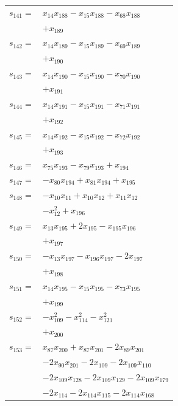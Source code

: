 \begin{longtable}{@{}r@{\;}l@{}}
\(s_{141}=\) & \(\displaystyle x_{14}x_{188} -x_{15}x_{188} -x_{68}x_{188}\) \\
 & \(\displaystyle +x_{189}\) \\[3pt]
\(s_{142}=\) & \(\displaystyle x_{14}x_{189} -x_{15}x_{189} -x_{69}x_{189}\) \\
 & \(\displaystyle +x_{190}\) \\[3pt]
\(s_{143}=\) & \(\displaystyle x_{14}x_{190} -x_{15}x_{190} -x_{70}x_{190}\) \\
 & \(\displaystyle +x_{191}\) \\[3pt]
\(s_{144}=\) & \(\displaystyle x_{14}x_{191} -x_{15}x_{191} -x_{71}x_{191}\) \\
 & \(\displaystyle +x_{192}\) \\[3pt]
\(s_{145}=\) & \(\displaystyle x_{14}x_{192} -x_{15}x_{192} -x_{72}x_{192}\) \\
 & \(\displaystyle +x_{193}\) \\[3pt]
\(s_{146}=\) & \(\displaystyle x_{75}x_{193} -x_{79}x_{193} +x_{194}\) \\[3pt]
\(s_{147}=\) & \(\displaystyle -x_{80}x_{194} +x_{81}x_{194} +x_{195}\) \\[3pt]
\(s_{148}=\) & \(\displaystyle -x_{10}x_{11} +x_{10}x_{12} +x_{11}x_{12}\) \\
 & \(\displaystyle -x_{12}^{2} +x_{196}\) \\[3pt]
\(s_{149}=\) & \(\displaystyle x_{13}x_{195} +2x_{195} -x_{195}x_{196}\) \\
 & \(\displaystyle +x_{197}\) \\[3pt]
\(s_{150}=\) & \(\displaystyle -x_{13}x_{197} -x_{196}x_{197} -2x_{197}\) \\
 & \(\displaystyle +x_{198}\) \\[3pt]
\(s_{151}=\) & \(\displaystyle x_{14}x_{195} -x_{15}x_{195} -x_{73}x_{195}\) \\
 & \(\displaystyle +x_{199}\) \\[3pt]
\(s_{152}=\) & \(\displaystyle -x_{109}^{2} -x_{114}^{2} -x_{121}^{2}\) \\
 & \(\displaystyle +x_{200}\) \\[3pt]
\(s_{153}=\) & \(\displaystyle x_{87}x_{200} +x_{87}x_{201} -2x_{89}x_{201}\) \\
 & \(\displaystyle -2x_{90}x_{201} -2x_{109} -2x_{109}x_{110}\) \\
 & \(\displaystyle -2x_{109}x_{128} -2x_{109}x_{129} -2x_{109}x_{179}\) \\
 & \(\displaystyle -2x_{114} -2x_{114}x_{115} -2x_{114}x_{168}\) \\

\end{longtable}
